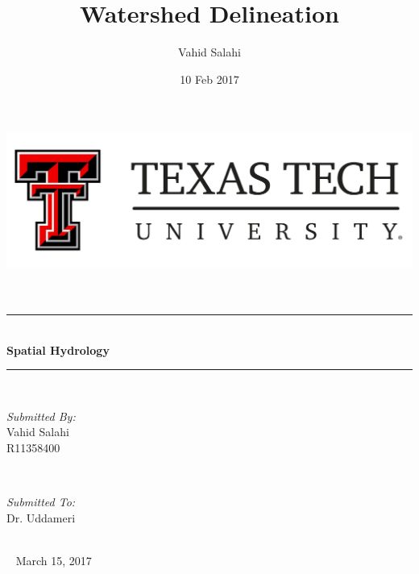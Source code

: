 \documentclass[letterpaper,12pt]{article}
\title{Watershed Delineation}								%
\author{Vahid Salahi}								%
\date{10 Feb 2017}											%
\begin{document}
	


\begin{titlepage}
	\centering
    \vspace*{0 cm}
    \includegraphics[scale = 0.2]{logottu}\\[3.0 cm]	%
    \\[2.0 cm]
	\textsc{\Large }\\[0.1 cm]				%
	\rule{\linewidth}{0.1 mm} \\[0.4 cm]
	{ \huge \bfseries Spatial Hydrology}\\
	\rule{\linewidth}{0.2 mm} \\[1.5 cm]
	
	\begin{minipage}{0.4\textwidth}
		\begin{flushleft} \large
			\emph{Submitted By:}\\
			Vahid Salahi\\
			R11358400\\
            
		\end{flushleft}
	\end{minipage}~
	\begin{minipage}{0.4\textwidth}   
		\begin{flushright} \large
			\emph{Submitted To:} \\
			Dr.	Uddameri\\
		\end{flushright}
        
	\end{minipage}\\[2 cm]

~
    { March 15, 2017}\\[1 cm]
    
\end{titlepage}

\end{document}

